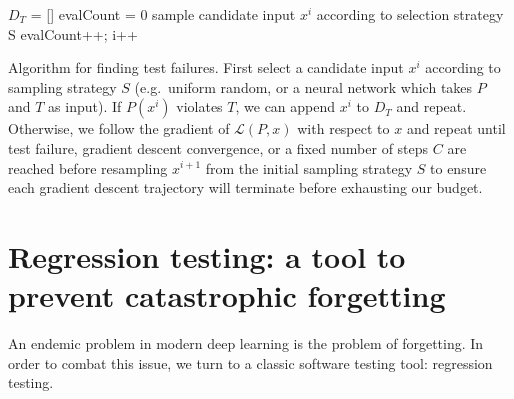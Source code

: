 \documentclass[12pt,initial,twoside,maitrise]{dms}
\numberwithin{equation}{section}
\numberwithin{table}{chapter}
\numberwithin{figure}{chapter}
\begin{document}
%
%

\begin{algorithm}

    $D_T$ = []\;
    evalCount = 0\;
     {
    sample candidate input $x^i$ according to selection strategy S\;
    evalCount++; i++\;
    }

    \caption{Algorithm for finding test failures. First select a candidate input $x^i$ according to sampling strategy $S$ (e.g.\ uniform random, or a neural network which takes $P$ and $T$ as input). If $P(x^i)$ violates $T$, we can append $x^i$ to $D_T$ and repeat. Otherwise, we follow the gradient of $\mathcal{L}(P, x)$ with respect to $x$ and repeat until test failure, gradient descent convergence, or a fixed number of steps $C$ are reached before resampling $x^{i+1}$ from the initial sampling strategy $S$ to ensure each gradient descent trajectory will terminate before exhausting our budget.}
\end{algorithm}

\section{Regression testing: a tool to prevent catastrophic forgetting}

An endemic problem in modern deep learning is the problem of forgetting. In order to combat this issue, we turn to a classic software testing tool: regression testing.
\end{document}
